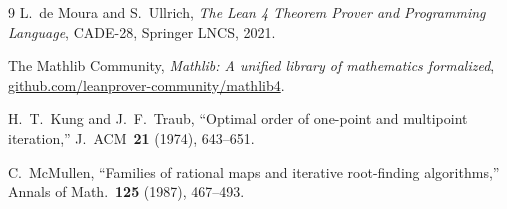 \documentclass[11pt,a4paper]{article}
\theoremstyle{definition}
\begin{document}
\begin{thebibliography}{9}
L.~de Moura and S.~Ullrich,
\textit{The Lean 4 Theorem Prover and Programming Language},
CADE-28, Springer LNCS, 2021.

The Mathlib Community,
\textit{Mathlib: A unified library of mathematics formalized},
\url{github.com/leanprover-community/mathlib4}.

H.~T.~Kung and J.~F.~Traub,
``Optimal order of one-point and multipoint iteration,''
J.~ACM~\textbf{21} (1974), 643--651.

C.~McMullen,
``Families of rational maps and iterative root-finding algorithms,''
Annals of Math.~\textbf{125} (1987), 467--493.

\end{thebibliography}
\end{document}
